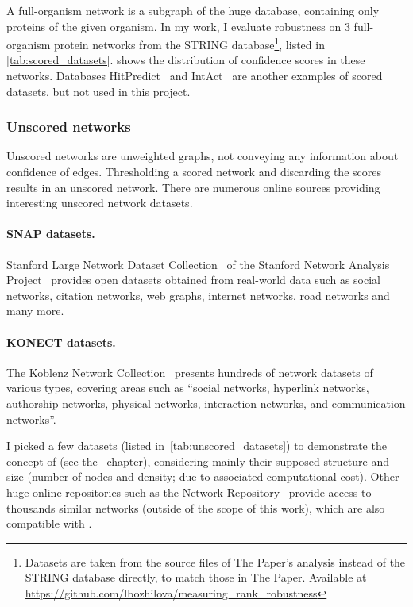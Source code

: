 


A full-organism network is a subgraph of the huge database, containing only proteins of the given organism.
In my work, I evaluate robustness on 3 full-organism protein networks from the STRING database\footnote{Datasets are taken from the source files of The Paper's analysis instead of the STRING database directly, to match those in The Paper. Available at \url{https://github.com/lbozhilova/measuring_rank_robustness}}, listed in \cref{tab:scored_datasets}.
 shows the distribution of confidence scores in these networks.
Databases HitPredict~\cite{LopezHitPredictVersionComprehensive2015} and IntAct~\cite{OrchardMIntActProjectIntAct2014} are another examples of scored datasets, but not used in this project.

\subsubsection*{Unscored networks}\label{sec:unscored_datasets}

Unscored networks are unweighted graphs, not conveying any information about confidence of edges.
Thresholding a scored network and discarding the scores results in an unscored network.
There are numerous online sources providing interesting unscored network datasets.

\paragraph*{SNAP datasets.} Stanford Large Network Dataset Collection~\cite{Large2016} of the Stanford Network Analysis Project~\cite{LeskovecSNAPGeneralPurpose2016} provides open datasets obtained from real-world data such as social networks, citation networks, web graphs, internet networks, road networks and many more.

\paragraph*{KONECT datasets.} The Koblenz Network Collection~\cite{Kunegis2013} presents hundreds of network datasets of various types, covering areas such as \enquote{social networks, hyperlink networks, authorship networks, physical networks, interaction networks, and communication networks}.

I picked a few datasets (listed in~\cref{tab:unscored_datasets}) to demonstrate the concept of \graffs (see the~ chapter), considering mainly their supposed structure and size (number of nodes and density; due to associated computational cost).
Other huge online repositories such as the Network Repository~\cite{RossiNetworkDataRepository2015} provide access to thousands similar networks (outside of the scope of this work), which are also compatible with \graffs.

